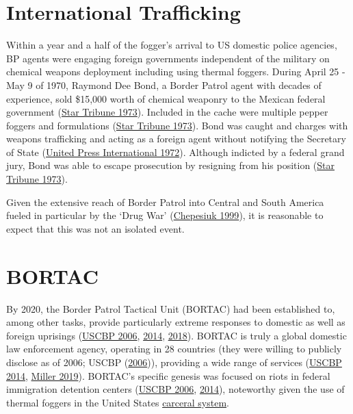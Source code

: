 \documentclass[
  11pt,
]{krantz}
\begin{document}
\hypertarget{international-trafficking}{%
\section{International Trafficking}\label{international-trafficking}}

Within a year and a half of the fogger's arrival to US domestic police agencies, BP agents were engaging foreign governments independent of the military on chemical weapons deployment including using thermal foggers.
During April 25 - May 9 of 1970, Raymond Dee Bond, a Border Patrol agent with decades of experience, sold \$15,000 worth of chemical weaponry to the Mexican federal government (\protect\hyperlink{ref-ValleyMorningStar1973_08_04}{Star Tribune 1973}).
Included in the cache were multiple pepper foggers and formulations (\protect\hyperlink{ref-ValleyMorningStar1973_08_04}{Star Tribune 1973}).
Bond was caught and charges with weapons trafficking and acting as a foreign agent without notifying the Secretary of State (\protect\hyperlink{ref-DailyNews1972_10_27}{United Press International 1972}).
Although indicted by a federal grand jury, Bond was able to escape prosecution by resigning from his position (\protect\hyperlink{ref-ValleyMorningStar1973_08_04}{Star Tribune 1973}).

Given the extensive reach of Border Patrol into Central and South America fueled in particular by the `Drug War' (\protect\hyperlink{ref-Chepesiuk1999}{Chepesiuk 1999}), it is reasonable to expect that this was not an isolated event.

\hypertarget{bortac}{%
\section{BORTAC}\label{bortac}}

By 2020, the Border Patrol Tactical Unit (BORTAC) had been established to, among other tasks, provide particularly extreme responses to domestic as well as foreign uprisings (\protect\hyperlink{ref-CBP2006}{USCBP 2006}, \protect\hyperlink{ref-CBP2014}{2014}, \protect\hyperlink{ref-CBP2018}{2018}).
BORTAC is truly a global domestic law enforcement agency, operating in 28 countries (they were willing to publicly disclose as of 2006; USCBP (\protect\hyperlink{ref-CBP2006}{2006})), providing a wide range of services (\protect\hyperlink{ref-CBP2014}{USCBP 2014}, \protect\hyperlink{ref-Miller2019}{Miller 2019}).
BORTAC's specific genesis was focused on riots in federal immigration detention centers (\protect\hyperlink{ref-CBP2006}{USCBP 2006}, \protect\hyperlink{ref-CBP2014}{2014}), noteworthy given the use of thermal foggers in the United States \protect\hyperlink{CarceralSystem}{carceral system}.
\end{document}
